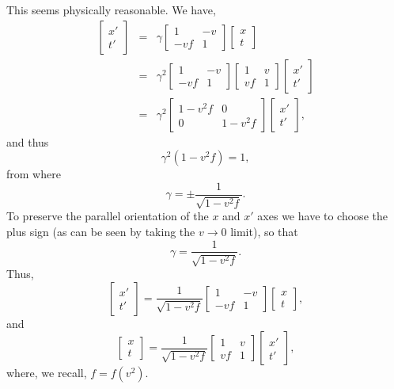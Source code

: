 \documentclass[twocolumn,preprintnumbers,amsmath,amssymb,final]{revtex4}
\def\BEq{\begin{equation}}
\def\EEq{\end{equation}}
\def\BEqA{\begin{eqnarray}}
\def\EEqA{\end{eqnarray}}
\def\g{\gamma}
\begin{document}
\noindent This seems physically reasonable. We have,
\BEqA
\begin{bmatrix}
x' \\ t'
\end{bmatrix}
&=&
\g
\begin{bmatrix}
1 & -v  \\
-vf & 1
\end{bmatrix}
\begin{bmatrix}
x \\ t
\end{bmatrix}
\nonumber \\
&=&
\g^2
\begin{bmatrix}
1 & -v  \\
-vf & 1
\end{bmatrix}
\begin{bmatrix}
1 & v  \\
vf & 1
\end{bmatrix}
\begin{bmatrix}
x' \\ t'
\end{bmatrix}
\nonumber \\
&=&
\g^2
\begin{bmatrix}
1-v^2f & 0  \\
0 & 1-v^2f
\end{bmatrix}
\begin{bmatrix}
x' \\ t'
\end{bmatrix},
\EEqA
and thus
\BEq
\g^2(1-v^2f)=1,
\EEq
from where
\BEq
\g = \pm \frac{1}{\sqrt{1-v^2f}}.
\EEq
To preserve the parallel orientation of the $x$ and $x'$ axes we have to choose the plus sign (as can be seen by taking the $v\rightarrow 0$ limit), so that
\BEq
\g = \frac{1}{\sqrt{1-v^2f}}.
\EEq
Thus,
\BEq
\begin{bmatrix}
x' \\ t'
\end{bmatrix}
=
\frac{1}{\sqrt{1-v^2f}}
\begin{bmatrix}
1 & -v  \\
-vf & 1
\end{bmatrix}
\begin{bmatrix}
x \\ t
\end{bmatrix},
\EEq
and
\BEq
\begin{bmatrix}
x \\ t
\end{bmatrix}
=
\frac{1}{\sqrt{1-v^2f}}
\begin{bmatrix}
1 & v  \\
vf & 1
\end{bmatrix}
\begin{bmatrix}
x' \\ t'
\end{bmatrix},
\EEq
where, we recall, $f = f(v^2)$.
\end{document}

